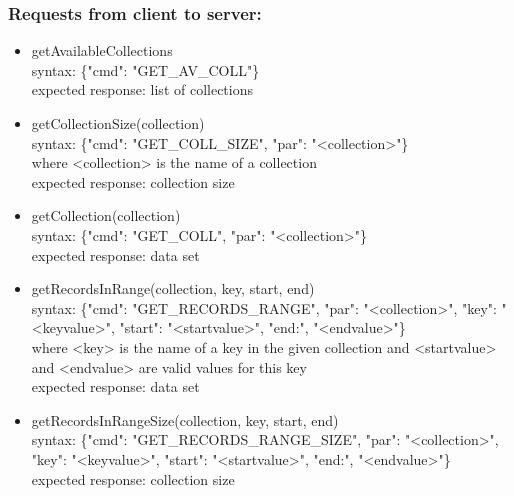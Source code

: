 \documentclass[oneside, english, final]{design}
\begin{document}
\subsubsection{Requests from client to server:}
\begin{itemize}
	\item{getAvailableCollections}
	      \\
	      syntax: \{"cmd": "GET\_AV\_COLL"\} \\
	      expected response: list of collections

	\item{getCollectionSize(collection)}
	      \\
	      syntax: \{"cmd": "GET\_COLL\_SIZE", "par": "<collection>"\} \\
	      where <collection> is the name of a collection\\
	      expected response: collection size

	\item{getCollection(collection)}
	      \\
	      syntax: \{"cmd": "GET\_COLL", "par": "<collection>"\} \\
	      expected response: data set

	\item{getRecordsInRange(collection, key, start, end)}
	      \\
	      syntax: \{"cmd": "GET\_RECORDS\_RANGE", "par": "<collection>", "key": "<keyvalue>", "start": "<startvalue>", "end:", "<endvalue>"\} \\
	      where <key> is the name of a key in the given collection and <startvalue> and <endvalue> are valid values for this key\\
	      expected response: data set

	\item{getRecordsInRangeSize(collection, key, start, end)}
	      \\
	      syntax: \{"cmd": "GET\_RECORDS\_RANGE\_SIZE", "par": "<collection>", "key": "<keyvalue>", "start": "<startvalue>", "end:", "<endvalue>"\} \\
	      expected response: collection size

\end{itemize}
\end{document}
